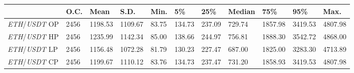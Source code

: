 \begin{tabular}{lllllllllll}
\toprule
 & \textbf{O.C.} & \textbf{Mean} & \textbf{S.D.} & \textbf{Min.} & \textbf{5\%} & \textbf{25\%} & \textbf{Median} & \textbf{75\%} & \textbf{95\%} & \textbf{Max.} \\
\midrule
\emph{ETH}/\emph{USDT} OP & 2456 & 1198.53 & 1109.67 & 83.75 & 134.73 & 237.09 & 729.74 & 1857.98 & 3419.53 & 4807.98 \\
\emph{ETH}/\emph{USDT} HP & 2456 & 1235.99 & 1142.34 & 85.00 & 138.66 & 244.97 & 756.81 & 1888.30 & 3542.72 & 4868.00 \\
\emph{ETH}/\emph{USDT} LP & 2456 & 1156.48 & 1072.28 & 81.79 & 130.23 & 227.47 & 687.00 & 1825.00 & 3283.30 & 4713.89 \\
\emph{ETH}/\emph{USDT} CP & 2456 & 1199.67 & 1110.12 & 83.76 & 134.73 & 237.47 & 731.20 & 1858.93 & 3419.53 & 4807.98 \\
\bottomrule
\end{tabular}
